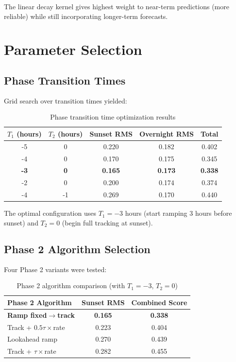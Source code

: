 \documentclass[11pt,letterpaper]{article}
\begin{document}
The linear decay kernel gives highest weight to near-term predictions (more reliable) while still incorporating longer-term forecasts.

\section{Parameter Selection}

\subsection{Phase Transition Times}

Grid search over transition times yielded:

\begin{table}[H]
\centering
\caption{Phase transition time optimization results}
\begin{tabular}{ccccc}
\toprule
$T_1$ (hours) & $T_2$ (hours) & Sunset RMS & Overnight RMS & Total \\
\midrule
-5 & 0 & 0.220 & 0.182 & 0.402 \\
-4 & 0 & 0.170 & 0.175 & 0.345 \\
\textbf{-3} & \textbf{0} & \textbf{0.165} & \textbf{0.173} & \textbf{0.338} \\
-2 & 0 & 0.200 & 0.174 & 0.374 \\
-4 & -1 & 0.269 & 0.170 & 0.440 \\
\bottomrule
\end{tabular}
\end{table}

The optimal configuration uses $T_1 = -3$ hours (start ramping 3 hours before sunset) and $T_2 = 0$ (begin full tracking at sunset).

\subsection{Phase 2 Algorithm Selection}

Four Phase 2 variants were tested:

\begin{table}[H]
\centering
\caption{Phase 2 algorithm comparison (with $T_1=-3$, $T_2=0$)}
\begin{tabular}{lcc}
\toprule
\textbf{Phase 2 Algorithm} & \textbf{Sunset RMS} & \textbf{Combined Score} \\
\midrule
\textbf{Ramp fixed$\rightarrow$track} & \textbf{0.165} & \textbf{0.338} \\
Track + $0.5\tau \times$rate & 0.223 & 0.404 \\
Lookahead ramp & 0.270 & 0.439 \\
Track + $\tau \times$rate & 0.282 & 0.455 \\
\bottomrule
\end{tabular}
\end{table}
\end{document}
